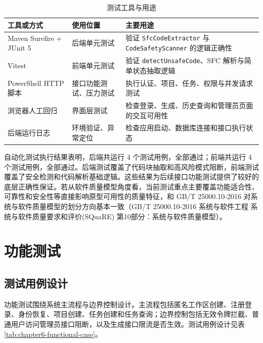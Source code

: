 \begin{table}[!htbp]
\centering
\caption{测试工具与用途}
\label{tab:chapter6-tools}
\small
\begin{tabular}{@{}p{}p{}p{}@{}}
\toprule
工具或方式 & 使用位置 & 主要用途 \\
\midrule
Maven Surefire + JUnit 5 & 后端单元测试 & 验证 \texttt{SfcCodeExtractor} 与 \texttt{CodeSafetyScanner} 的逻辑正确性 \\
Vitest & 前端单元测试 & 验证 \texttt{detectUnsafeCode}、SFC 解析与简单状态抽取逻辑 \\
PowerShell HTTP 脚本 & 接口功能测试、压力测试 & 执行认证、项目、任务、权限与并发请求测试 \\
浏览器人工回归 & 界面层测试 & 检查登录、生成、历史查询和管理员页面的交互可用性 \\
后端运行日志 & 环境验证、异常定位 & 检查应用启动、数据库连接和接口执行状态 \\
\bottomrule
\end{tabular}
\end{table}

自动化测试执行结果表明，后端共运行 4 个测试用例，全部通过；前端共运行 4 个测试用例，全部通过。后端测试覆盖了代码块抽取和高风险模式阻断，前端测试覆盖了安全检测和代码解析基础逻辑。这些结果为后续接口功能测试提供了较好的底层正确性保证。若从软件质量模型角度看，当前测试重点主要覆盖功能适合性、可靠性和安全性等直接影响原型可用性的质量特征，和 GB/T 25000.10-2016 对系统与软件质量模型的划分方向基本一致（GB/T 25000.10-2016 系统与软件工程 系统与软件质量要求和评价(SQuaRE) 第10部分：系统与软件质量模型）\cite{gbt25000_2016}。

\section{功能测试}

\subsection{测试用例设计}
功能测试围绕系统主流程与边界控制设计。主流程包括匿名工作区创建、注册登录、身份恢复、项目创建、任务创建和任务查询；边界控制包括无效令牌拦截、普通用户访问管理员接口阻断，以及生成接口限流是否生效。测试用例设计见表 \ref{tab:chapter6-functional-case}。

